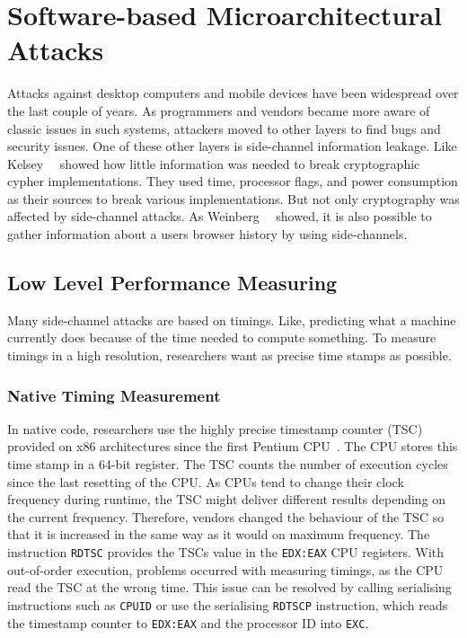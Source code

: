 \section{Software-based Microarchitectural Attacks}

Attacks against desktop computers and mobile devices have been widespread over
the last couple of years. As programmers and vendors became more aware of
classic issues in such systems, attackers moved to other layers to find bugs and
security issues. One of these other layers is side-channel information leakage.
Like Kelsey~\etal~\cite{kelsey1998side} showed how little information was needed
to break cryptographic cypher implementations. They used time, processor flags,
and power consumption as their sources to break various implementations. But not
only cryptography was affected by side-channel attacks. As
Weinberg~\etal~\cite{weinberg2011still} showed, it is also possible to gather
information about a users browser history by using side-channels.

\subsection{Low Level Performance Measuring}

Many side-channel attacks are based on timings. Like, predicting what a machine
currently does because of the time needed to compute something. To measure
timings in a high resolution, researchers want as precise time stamps as
possible.

\subsubsection{Native Timing Measurement}

In native code, researchers use the highly precise timestamp counter (TSC)
provided on x86 architectures since the first Pentium CPU~\cite{intelsys}. The
CPU stores this time stamp in a 64-bit register. The TSC counts the number of
execution cycles since the last resetting of the CPU. As CPUs tend to change
their clock frequency during runtime, the TSC might deliver different results
depending on the current frequency. Therefore, vendors changed the behaviour of
the TSC so that it is increased in the same way as it would on maximum
frequency. The instruction \texttt{RDTSC} provides the TSC\textquotesingle s
value in the
\texttt{EDX:EAX} CPU registers. With out-of-order execution, problems occurred
with measuring timings, as the CPU read the TSC at the wrong time. This issue
can be resolved by calling serialising instructions such as \texttt{CPUID} or
use the serialising \texttt{RDTSCP} instruction, which reads the timestamp
counter to \texttt{EDX:EAX} and the processor ID into \texttt{EXC}.


